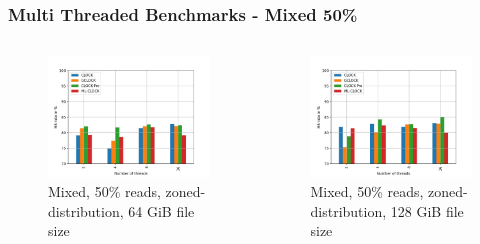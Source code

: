 \documentclass[
	aspectratio=169,
	compress,
]{beamer}
\newcommand{\navframetitle}[1]{\frametitle{#1\hfill{\footnotesize\lastsection{}}}}
\begin{document}
\begin{frame}[fragile]
	\navframetitle{Multi Threaded Benchmarks - Mixed 50\%}

	\begin{columns}
		\begin{column}{0.5\textwidth}
			\begin{figure}[ht]
    			\centering
    			\includegraphics[width=\textwidth]{multi_64_gb_rw_50to50_zoned.jpg}
        		\caption{Mixed, 50\% reads, zoned-distribution, 64 GiB file size}
			\end{figure}
		\end{column}
		\begin{column}{0.5\textwidth}
			\begin{figure}[ht]
    			\centering
    			\includegraphics[width=\textwidth]{multi_128_gb_rw_50to50_zoned.jpg}
        		\caption{Mixed, 50\% reads, zoned-distribution, 128 GiB file size}
			\end{figure}			
		\end{column}
	\end{columns}
\end{frame}
\end{document}
